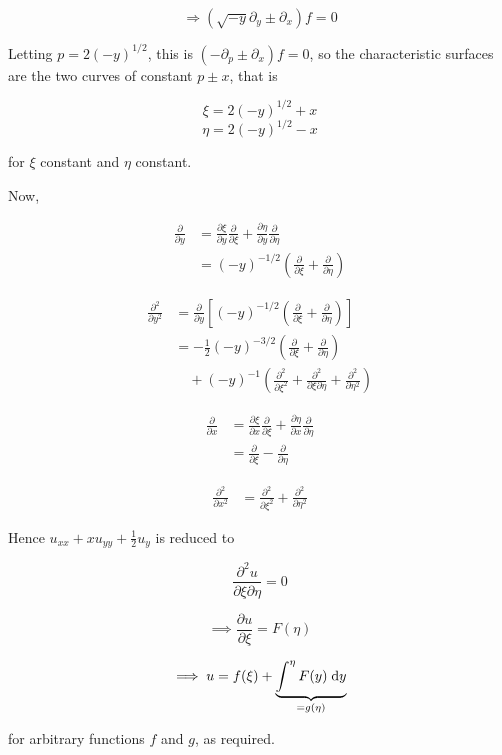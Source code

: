\documentclass[a4paper]{article}
\begin{document}
\begin{enumerate}
	\[ \Rightarrow ( \sqrt{-y} \partial_{y} \pm \partial_{x}  ) f = 0  \]
	
	 Letting $ p = 2 (-y)^{1/2} $, this is $ (- \partial_{p} \pm \partial_{x})f = 0 $, so the characteristic surfaces are the two curves of constant $ p \pm x $, that is
	
		
	\[ \xi = 2(-y)^{1/2} + x \]
	\[ \eta = 2(-y)^{1/2} - x \]
	
	for $ \xi $ constant and $ \eta $ constant.
	
	Now,
	
	\begin{align*}
	\frac{\partial }{\partial y} & = \frac{\partial \xi}{\partial y} \frac{\partial }{\partial \xi} + \frac{\partial \eta }{\partial y} \frac{\partial }{\partial \eta}    \\
	& = (-y)^{-1/2} \left( \frac{\partial }{\partial \xi} + \frac{\partial }{\partial \eta}  \right) 
	\end{align*}
	
	\begin{align*}
	\frac{\partial^{2} }{\partial y^{2}} & = \frac{\partial }{\partial y}\left[ (-y)^{-1/2} \left( \frac{\partial }{\partial \xi} + \frac{\partial }{\partial \eta}  \right) \right]   \\
	& = - \frac{1}{2} (-y)^{-3/2} \left( \frac{\partial }{\partial \xi} + \frac{\partial }{\partial \eta}  \right) \\
	& \quad  + (-y)^{-1} \left(   \frac{\partial^{2} }{\partial \xi^{2}} + \frac{\partial^{2} }{\partial \xi \partial \eta}  + \frac{\partial^{2} }{\partial \eta^{2}} \right) 
	\end{align*}
	
	\begin{align*}
	\frac{\partial }{\partial x} & = \frac{\partial \xi}{\partial x} \frac{\partial }{\partial \xi} + \frac{\partial \eta }{\partial x} \frac{\partial }{\partial \eta}    \\
	& = \frac{\partial }{\partial \xi} - \frac{\partial }{\partial \eta} 
	\end{align*}
	
	\begin{align*}
	\frac{\partial^{2} }{\partial x^{2}} & = \frac{\partial^{2} }{\partial \xi^{2}} + \frac{\partial^{2} }{\partial \eta^{2}} 
	\end{align*}
	
	Hence $ u_{xx} + xu_{yy} + \frac{1}{2} u_{y} $ is reduced to
	
	\[ \frac{\partial^{2} u}{\partial \xi \partial \eta} = 0 \]
	
	\[  \implies \frac{\partial u }{\partial \xi} = F(\eta) \]
	
	\[  \implies u = f(\xi)  +   \underbrace{\int^{\eta}  F(y) \; \mathrm{d} y}_{=g(\eta)} \]
	
	for arbitrary functions $ f $ and $ g $, as required. 
	
	 
	
\end{enumerate}
\end{document}
